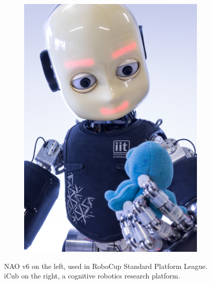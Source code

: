 \begin{figure}
\begin{subfigure}[b]{0.4\textwidth}
    \includegraphics[width=\textwidth]{figures/iCub.jpg}
    \caption{}
    \label{fig:iCub}
  \end{subfigure}
  \caption{NAO v6 \cite{NAOdesign} on the left, used in RoboCup Standard 
      Platform League. iCub \cite{Sandini2007iCub} on the right, a cognitive 
      robotics research platform.}
\end{figure}


